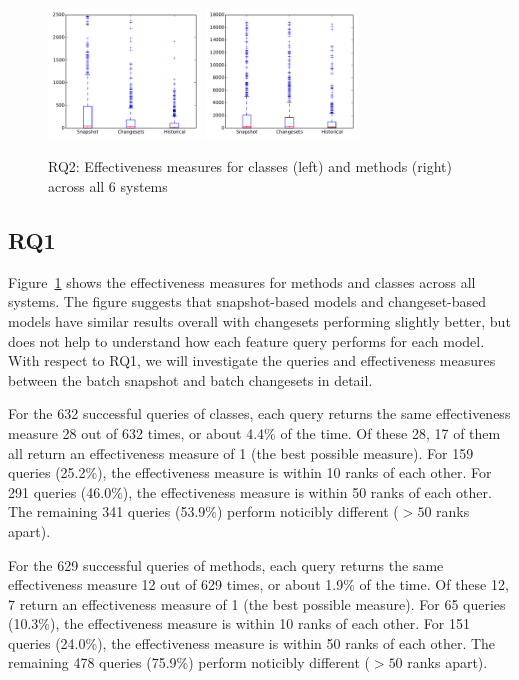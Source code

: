 \begin{figure}[t]
\centering
\includegraphics[width=0.36\textwidth]{figures/rq2-overall-class}
\includegraphics[width=0.36\textwidth]{figures/rq2-overall-method}
\caption{RQ2: Effectiveness measures for classes (left) and methods (right) across all 6 systems}
\label{fig:em}
\end{figure}

\subsection{RQ1}

Figure~\ref{fig:em} shows the effectiveness measures for methods and classes
across all systems. The figure suggests that snapshot-based models and
changeset-based models have similar results overall with changesets performing
slightly better, but does not help to understand how each feature query performs
for each model.  With respect to RQ1, we will investigate the queries and
effectiveness measures between the batch snapshot and batch changesets in
detail.

For the 632 successful queries of classes, each query returns the same
effectiveness measure 28 out of 632 times, or about 4.4\% of the time.  Of these
28, 17 of them all return an effectiveness measure of 1 (the best possible
measure).  For 159 queries (25.2\%), the effectiveness measure is within 10
ranks of each other.  For 291 queries (46.0\%), the effectiveness measure is
within 50 ranks of each other.  The remaining 341 queries (53.9\%) perform
noticibly different ($> 50$ ranks apart).

For the 629 successful queries of methods, each query returns the same
effectiveness measure 12 out of 629 times, or about 1.9\% of the time.  Of these
12, 7 return an effectiveness measure of 1 (the best possible measure).  For 65
queries (10.3\%), the effectiveness measure is within 10 ranks of each other.
For 151 queries (24.0\%), the effectiveness measure is within 50 ranks of each
other.  The remaining 478 queries (75.9\%) perform noticibly different ($> 50$
ranks apart).

